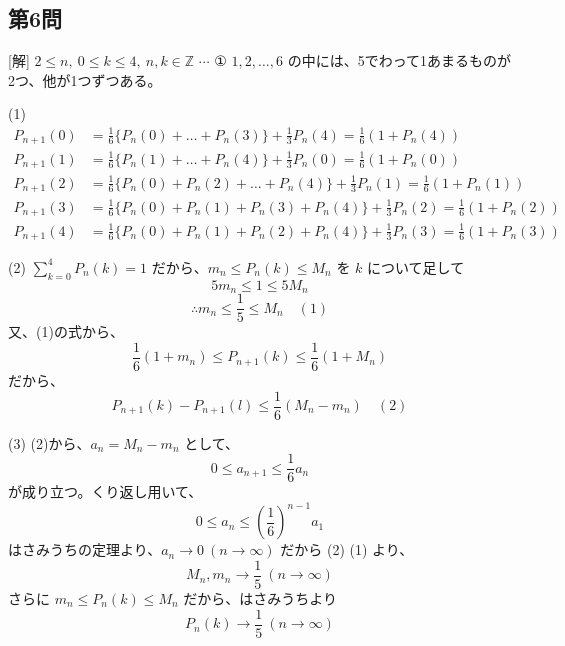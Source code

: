 \documentclass[../main.tex]{subfiles}
\begin{document}
\subsection*{第6問}
[解] $2 \le n, \ 0 \le k \le 4, \ n, k \in \mathbb{Z}$ $\cdots$ ①
$1, 2, \dots, 6$ の中には、5でわって1あまるものが2つ、他が1つずつある。

(1)
\begin{align*}
  P_{n+1}(0) &= \frac{1}{6} \{ P_n(0) + \dots + P_n(3) \} + \frac{1}{3} P_n(4) = \frac{1}{6}(1 + P_n(4)) \\
  P_{n+1}(1) &= \frac{1}{6} \{ P_n(1) + \dots + P_n(4) \} + \frac{1}{3} P_n(0) = \frac{1}{6}(1 + P_n(0)) \\
  P_{n+1}(2) &= \frac{1}{6} \{ P_n(0) + P_n(2) + \dots + P_n(4) \} + \frac{1}{3} P_n(1) = \frac{1}{6}(1 + P_n(1)) \\
  P_{n+1}(3) &= \frac{1}{6} \{ P_n(0) + P_n(1) + P_n(3) + P_n(4) \} + \frac{1}{3} P_n(2) = \frac{1}{6}(1 + P_n(2)) \\
  P_{n+1}(4) &= \frac{1}{6} \{ P_n(0) + P_n(1) + P_n(2) + P_n(4) \} + \frac{1}{3} P_n(3) = \frac{1}{6}(1 + P_n(3))
\end{align*}

(2) $\sum_{k=0}^4 P_n(k) = 1$ だから、$m_n \le P_n(k) \le M_n$ を $k$ について足して
\[ 5m_n \le 1 \le 5M_n \]
\[ \therefore m_n \le \frac{1}{5} \le M_n \quad (1) \]
又、(1)の式から、
\[ \frac{1}{6}(1 + m_n) \le P_{n+1}(k) \le \frac{1}{6}(1 + M_n) \]
だから、
\[ P_{n+1}(k) - P_{n+1}(l) \le \frac{1}{6}(M_n - m_n) \quad (2) \]

(3) (2)から、$a_n = M_n - m_n$ として、
\[ 0 \le a_{n+1} \le \frac{1}{6} a_n \]
が成り立つ。くり返し用いて、
\[ 0 \le a_n \le \left(\frac{1}{6}\right)^{n-1} a_1 \]
はさみうちの定理より、$a_n \to 0 \ (n \to \infty)$ だから (2) (1) より、
\[ M_n, m_n \to \frac{1}{5} \ (n \to \infty) \]
さらに $m_n \le P_n(k) \le M_n$ だから、はさみうちより
\[ P_n(k) \to \frac{1}{5} \ (n \to \infty) \]
\end{document}
